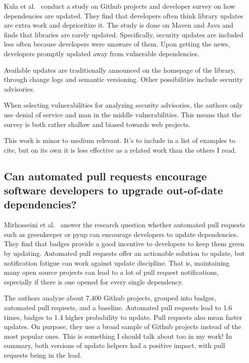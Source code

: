 Kula et al.~\cite{kula2017} conduct a study on Github projects and developer survey on how dependencies are updated.
They find that developers often think library updates are extra work and deprioritize it.
The study is done on Maven and Java and finds that libraries are rarely updated.
Specifically, security updates are included less often because developers were unaware of them.
Upon getting the news, developers promptly updated away from vulnerable dependencies.

Available updates are traditionally announced on the homepage of the library, through change logs and semantic versioning.
Other possibilities include security advisories.

When selecting vulnerabilities for analyzing security advisories, the authors only use denial of service and man in the
middle vulnerabilities.
This means that the survey is both rather shallow and biased towards web projects.

This work is minor to medium relevant.
It's to include in a list of examples to cite, but on its own it is less effective as a related work than the others
I read.



\subsection{Can automated pull requests encourage software developers to upgrade out-of-date dependencies?}
\label{subsec:can-automated-pull-requests-encourage-software-developers-to-upgrade-out-of-date-dependencies?}

Mirhosseini et al.~\cite{mirhosseini2017} answer the research question whether automated pull requests such as greenkeeper
or pyup can encourage developers to update dependencies.
They find that badges provide a good incentive to developers to keep them green by updating.
Automated pull requests offer an actionable solution to update, but notification fatigue can work against update
discipline.
That is, maintaining many open source projects can lead to a lot of pull request notifications, especially if there is
one opened for every single dependency.

The authors analyze about 7,400 Github projects, grouped into badges, automated pull requests, and a baseline.
Automated pull requests lead to 1.6 times, badges to 1.4 higher probability to update.
Pull requests also mean faster updates.
On purpose, they use a broad sample of Github projects instead of the most popular ones.
This is something I should talk about too in my work!
In summary, both versions of update helpers had a positive impact, with pull requests being in the lead.

